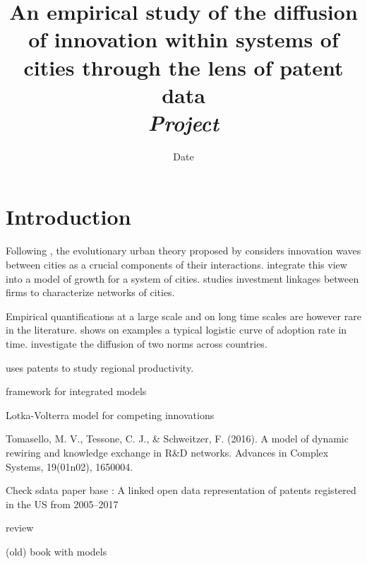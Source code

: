 


\title{An empirical study of the diffusion of innovation within systems of cities through the lens of patent data\\
\textit{Project}
}
\author{}
\date{Date}


\maketitle

\justify


\begin{abstract}

\end{abstract}




\section{Introduction}

Following \cite{hagerstrand1968innovation}, the evolutionary urban theory proposed by \cite{pumain2018evolutionary} considers innovation waves between cities as a crucial components of their interactions. \cite{favaro2011gibrat} integrate this view into a model of growth for a system of cities. \cite{finance2016villes} studies investment linkages between firms to characterize networks of cities.

Empirical quantifications at a large scale and on long time scales are however rare in the literature. \cite{grubler1996time} shows on examples a typical logistic curve of adoption rate in time. \cite{albuquerque2007spatiotemporal} investigate the diffusion of two norms across countries.

\cite{acs2002patents} uses patents to study regional productivity.

\cite{wejnert2002integrating} framework for integrated models

\cite{sonis1983spatio} Lotka-Volterra model for competing innovations


Tomasello, M. V., Tessone, C. J., & Schweitzer, F. (2016). A model of dynamic rewiring and knowledge exchange in R&D networks. Advances in Complex Systems, 19(01n02), 1650004.

Check sdata paper base : A linked open data representation of patents registered in the US from 2005--2017

\cite{meade2006modelling} review

\cite{mahajan1985models} (old) book with models

